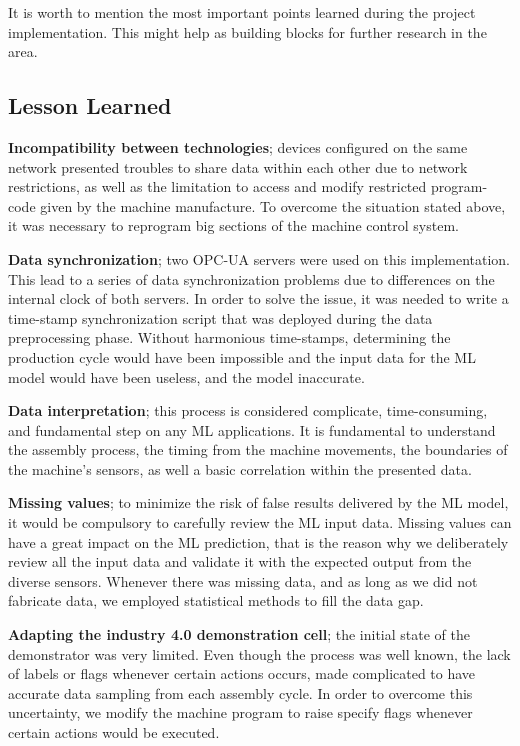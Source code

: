 \documentclass[5p,times,procedia]{elsarticle}
\begin{document}
It is worth to mention the most important points learned during the project implementation. This might help as building blocks for further research in the area.

\subsection{Lesson Learned} %

\textbf{Incompatibility between technologies}; devices configured on the same network presented troubles to share data within each other due to network restrictions, as well as the limitation to access and modify restricted program-code given by the machine manufacture. 
To overcome the situation stated above, it was necessary to reprogram big sections of the machine control system.

\textbf{Data synchronization}; two OPC-UA servers were used on this implementation. This lead to a series of data synchronization problems due to differences on the internal clock of both servers.
In order to solve the issue, it was needed to write a time-stamp synchronization script that was deployed during the data preprocessing phase. Without harmonious time-stamps, determining the production cycle would have been impossible and the input data for the ML model would have been useless, and the model inaccurate. 

\textbf{Data interpretation}; this process is considered complicate, time-consuming, and fundamental step on any ML applications. It is fundamental to understand the assembly process, the timing from the machine movements, the boundaries of the machine's sensors, as well a basic correlation within the presented data.

\textbf{Missing values}; to minimize the risk of false results delivered by the ML model, it would be compulsory to carefully review the ML input data. Missing values can have a great impact on the ML prediction, that is the reason why we deliberately review all the input data and validate it with the expected output from the diverse sensors. Whenever there was missing data, and as long as we did not fabricate data, we employed statistical methods to fill the data gap.

\textbf{Adapting the industry 4.0 demonstration cell}; the initial state of the demonstrator was very limited. Even though the process was well known, the lack of labels or flags whenever certain actions occurs, made complicated to have accurate data sampling from each assembly cycle. In order to overcome this uncertainty, we modify the machine program to raise specify flags whenever certain actions would be executed.
\end{document}
